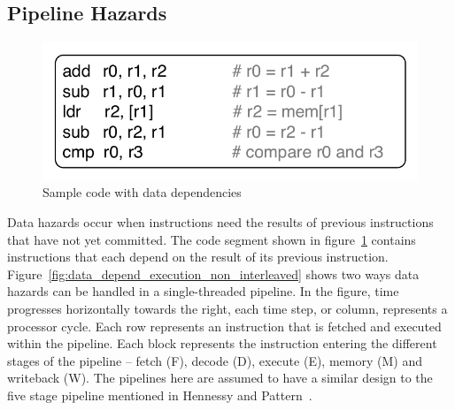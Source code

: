 \subsection{Pipeline Hazards}
\begin{figure}
  \vspace{-20pt}
  \begin{center}
    \includegraphics[scale=.65]{figs/sample_data_dependent_code}
  \end{center}
  \vspace{-20pt}
  \caption{Sample code with data dependencies}
  \label{fig:sample_data_dependent_code}
\end{figure}
Data hazards occur when instructions need the results of previous instructions that have not yet committed.
The code segment shown in figure~\ref{fig:sample_data_dependent_code} contains instructions that each depend on the result of its previous instruction.
Figure~\ref{fig:data_depend_execution_non_interleaved} shows two ways data hazards can be handled in a single-threaded pipeline. 
In the figure, time progresses horizontally towards the right, each time step, or column, represents a processor cycle.
Each row represents an instruction that is fetched and executed within the pipeline.
Each block represents the instruction entering the different stages of the pipeline -- fetch (F), decode (D), execute (E), memory (M) and writeback (W).   
The pipelines here are assumed to have a similar design to the five stage pipeline mentioned in Hennessy and Pattern~.

